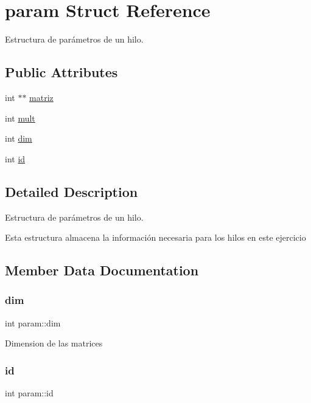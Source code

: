 \hypertarget{structparam}{}\section{param Struct Reference}
\label{structparam}


Estructura de parámetros de un hilo.  


\subsection*{Public Attributes}
\begin{DoxyCompactItemize}
\item 
int $\ast$$\ast$ \mbox{\hyperlink{structparam_af5ed705ed1a83675011b4e89d35b91a2}{matriz}}
\item 
int \mbox{\hyperlink{structparam_a6e90bf3ec4545c53ebd617b79b1f5350}{mult}}
\item 
int \mbox{\hyperlink{structparam_a3a102879f95c2d38a100f38dfd6866e4}{dim}}
\item 
int \mbox{\hyperlink{structparam_a413f8071501a89323a249e88c5f7d0a9}{id}}
\end{DoxyCompactItemize}


\subsection{Detailed Description}
Estructura de parámetros de un hilo. 

Esta estructura almacena la información necesaria para los hilos en este ejercicio 

\subsection{Member Data Documentation}
\mbox{\label{structparam_a3a102879f95c2d38a100f38dfd6866e4}} 
\subsubsection{\texorpdfstring{dim}{dim}}
{\footnotesize\ttfamily int param\+::dim}

Dimension de las matrices \mbox{\label{structparam_a413f8071501a89323a249e88c5f7d0a9}} 
\subsubsection{\texorpdfstring{id}{id}}
{\footnotesize\ttfamily int param\+::id}

